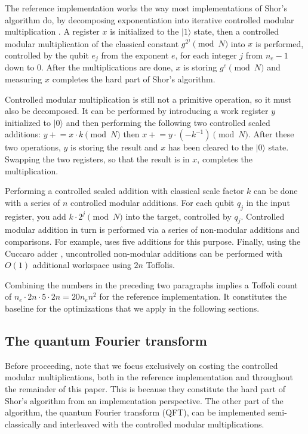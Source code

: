 \documentclass[superscriptaddress,notitlepage,longbibliography]{revtex4-1}
\theoremstyle{definition}
\theoremstyle{definition}
\newcommand{\lenexp}{{n_e}}
\newcommand{\productreg}{x}
\newcommand{\workreg}{y}
\newcommand{\gen}{g}
\begin{document}
The reference implementation works the way most implementations of Shor's algorithm do, by decomposing exponentiation into iterative controlled modular multiplication \cite{vedral1996arithmetic, zalka1998fast, zalka2006pure, beauregard2002shor, haner2016factoring, gidney2017factoring}.
A register $\productreg$ is initialized to the $|1\rangle$ state, then a controlled modular multiplication of the classical constant $\gen^{2^j} \pmod{N}$ into $\productreg$ is performed, controlled by the qubit $e_j$ from the exponent $e$, for each integer $j$ from $\lenexp-1$ down to $0$.
After the multiplications are done, $\productreg$ is storing $\gen^e \pmod{N}$ and measuring $\productreg$ completes the hard part of Shor's algorithm.

Controlled modular multiplication is still not a primitive operation, so it must also be decomposed.
It can be performed by introducing a work register $\workreg$ initialized to $|0\rangle$ and then performing the following two controlled scaled additions: $\workreg \mathrel{+}= \productreg \cdot k \pmod{N}$ then $\productreg \mathrel{+}= \workreg \cdot (-k^{-1}) \pmod{N}$.
After these two operations, $\workreg$ is storing the result and $\productreg$ has been cleared to the $|0\rangle$ state.
Swapping the two registers, so that the result is in $\productreg$, completes the multiplication.

Performing a controlled scaled addition with classical scale factor $k$ can be done with a series of $n$ controlled modular additions.
For each qubit $q_j$ in the input register, you add $k \cdot 2^j \pmod{N}$ into the target, controlled by $q_j$.
Controlled modular addition in turn is performed via a series of non-modular additions and comparisons.
For example, \cite{vedral1996arithmetic} uses five additions for this purpose.
Finally, using the Cuccaro adder \cite{cuccaro2004adder}, uncontrolled non-modular additions can be performed with $O(1)$ additional workspace using $2n$ Toffolis.

Combining the numbers in the preceding two paragraphs implies a Toffoli count of $\lenexp \cdot 2n \cdot 5 \cdot 2n = 20 \lenexp n^2$ for the reference implementation.
It constitutes the baseline for the optimizations that we apply in the following sections.

\subsection{The quantum Fourier transform}
Before proceeding, note that we focus exclusively on costing the controlled modular multiplications, both in the reference implementation and throughout the remainder of this paper.
This is because they constitute the hard part of Shor's algorithm from an implementation perspective.
The other part of the algorithm, the quantum Fourier transform (QFT), can be implemented semi-classically \cite{griffiths1996semiclassical} and interleaved with the controlled modular multiplications.
\end{document}

